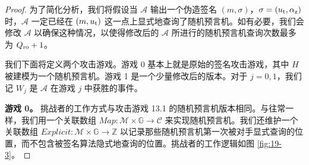 \begin{proof}
为了简化分析，我们将假设当 $\mathcal{A}$ 输出一个伪造签名 $(m,\sigma)$，$\sigma=(u_{\rm t},\alpha_{\rm z})$ 时，$\mathcal{A}$ 一定已经在 $(m,u_{\rm t})$ 这一点上显式地查询了随机预言机。如有必要，我们会修改 $\mathcal{A}$ 以确保这种情况，以使得修改后的 $\mathcal{A}$ 所进行的随机预言机查询次数最多为 $Q_{\rm ro}+1$。

我们下面将定义两个攻击游戏。游戏 0 基本上就是原始的签名攻击游戏，其中 $H$ 被建模为一个随机预言机。游戏 1 是一个少量修改后的版本。对于 $j=0,1$，我们记 $W_j$ 是 $\mathcal{A}$ 在游戏 $j$ 中获胜的事件。

\noindent
\textbf{游戏 0。}
挑战者的工作方式与攻击游戏 13.1 的随机预言机版本相同。与往常一样，我们用一个关联数组 $Map:\mathcal{M}\times\mathbb{G}\to\mathcal{C}$ 来实现随机预言机。我们还维护一个关联数组 $Explicit:\mathcal{M}\times\mathbb{G}\to\mathbb{Z}$ 以记录那些随机预言机第一次被对手显式查询的位置，而不包含被签名算法隐式地查询的位置。挑战者的工作逻辑如图 \ref{fig:19-3}。


\end{proof}
